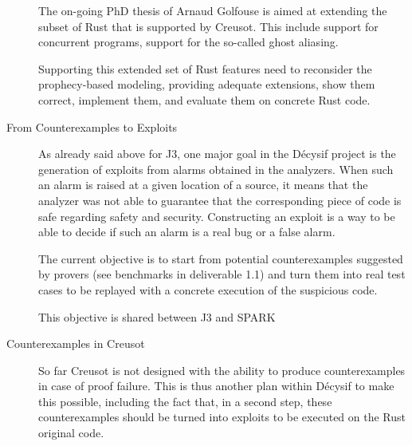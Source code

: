 \documentclass[a4paper,11pt]{article}
\begin{document}
\begin{description}

  The on-going PhD thesis of Arnaud Golfouse is aimed at extending the subset of
  Rust that is supported by Creusot. This include support for concurrent
  programs, support for the so-called ghost aliasing.

  Supporting this extended set of Rust features need to reconsider the
  prophecy-based modeling, providing adequate extensions, show them correct,
  implement them, and evaluate them on concrete Rust code.

\item[From Counterexamples to Exploits]


  As already said above for J3, one major goal in the Décysif project is the
  generation of exploits from alarms obtained in the analyzers. When such an
  alarm is raised at a given location of a source, it means that the analyzer
  was not able to guarantee that the corresponding piece of code is safe
  regarding safety and security. Constructing an exploit is a way to be able to
  decide if such an alarm is a real bug or a false alarm.

  The current objective is to start from potential counterexamples suggested by
  provers (see benchmarks in deliverable 1.1) and turn them into real test cases
  to be replayed with a concrete execution of the suspicious code.

  This objective is shared between J3 and SPARK

\item[Counterexamples in Creusot]


  So far Creusot is not designed with the ability to produce counterexamples in
  case of proof failure. This is thus another plan within Décysif to make this
  possible, including the fact that, in a second step, these counterexamples
  should be turned into exploits to be executed on the Rust original code.

\end{description}


%


\end{document}
